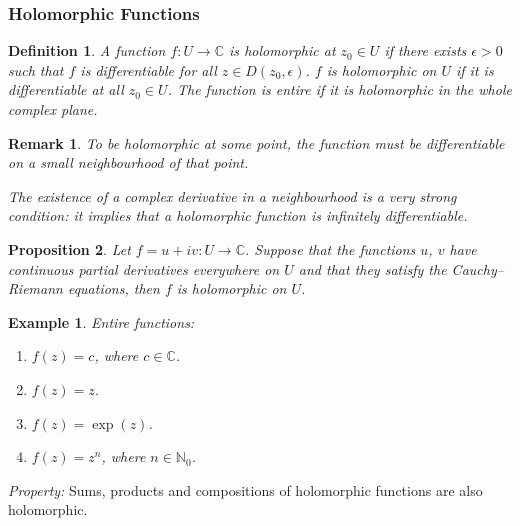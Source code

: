 \documentclass{article}
\theoremstyle{plain}\theoremheaderfont{\normalfont\itshape}\theorembodyfont{\rmfamily}\theoremseparator{.}\newtheorem*{rem}{Remark}\newtheorem*{ex}{Example}\newtheorem*{proof}{Proof}\newtheorem*{altp}{Alternative proof}
\theoremstyle{plain}\theoremheaderfont{\normalfont\bfseries}\theorembodyfont{\rmfamily}\theoremseparator{.}\newtheorem{thm}{Theorem}[section]\newtheorem{lem}[thm]{Lemma}\newtheorem{prop}[thm]{Proposition}\newtheorem*{cor}{Corollary}\newtheorem{defn}[thm]{Definition}\newtheorem{clm}[thm]{Claim}\newtheorem{clminproof}{Claim}
\theoremstyle{break}\theoremheaderfont{\normalfont\itshape}\theorembodyfont{\rmfamily}\theoremseparator{.\medskip}\newtheorem*{proofskip}{Proof}\newtheorem*{exs}{Examples}\newtheorem*{rems}{Remarks}
\theoremstyle{break}\theoremheaderfont{\normalfont\bfseries}\theorembodyfont{\rmfamily}\theoremseparator{.\medskip}\newtheorem{lemskip}[thm]{Lemma}\newtheorem{defnskip}[thm]{Definition}\newtheorem{propskip}[thm]{Proposition}\newtheorem{thmskip}[thm]{Theorem}
\numberwithin{equation}{section}
\begin{document}
	\subsubsection{Holomorphic Functions}
	\begin{defn}
		A function \(f:U\to\mathbb{C}\) is \textit{holomorphic} at \(z_0\in U\) if there exists \(\epsilon>0\) such that \(f\) is differentiable for all \(z\in D(z_0,\epsilon)\). \(f\) is \textit{holomorphic on \(U\)} if it is differentiable at all \(z_0\in U\). The function is \textit{entire} if it is holomorphic in the whole complex plane.
	\end{defn}
	\begin{rem}
		To be holomorphic at some point, the function must be differentiable on a small neighbourhood of that point.
		
		The existence of a complex derivative in a neighbourhood is a very strong condition: it implies that a holomorphic function is infinitely differentiable.
	\end{rem}
	\begin{prop}
		Let \(f=u+iv:U\to \mathbb{C}\). Suppose that the functions \(u\), \(v\) have continuous partial derivatives everywhere on \(U\) and that they satisfy the Cauchy--Riemann equations, then \(f\) is holomorphic on \(U\).
	\end{prop}
	\begin{ex}
		Entire functions:
		\begin{enumerate}[topsep=0pt]
			\item \(f(z)=c\), where \(c\in\mathbb{C}\).
			\item \(f(z)=z\).
			\item \(f(z)=\exp(z)\).
			\item \(f(z)=z^n\), where \(n\in\mathbb{N}_0\).
		\end{enumerate}
	\end{ex}
	\textit{Property:} Sums, products and compositions of holomorphic functions are also holomorphic.
	
\end{document}
